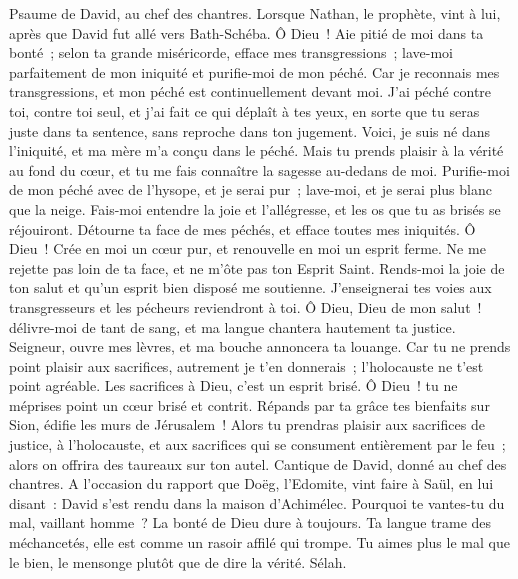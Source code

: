 \begin{multicols}{2}
\VerseOne{}Psaume de David, au chef des chantres.
Lorsque Nathan, le prophète, vint à lui, après que David fut allé vers Bath-Schéba.
Ô Dieu~! Aie pitié de moi dans ta bonté~; selon ta grande miséricorde, efface mes transgressions~;
lave-moi parfaitement de mon iniquité et purifie-moi de mon péché.
Car je reconnais mes transgressions, et mon péché est continuellement devant moi.
J'ai péché contre toi, contre toi seul, et j'ai fait ce qui déplaît à tes yeux, en sorte que tu seras juste dans ta sentence, sans reproche dans ton jugement.
Voici, je suis né dans l'iniquité, et ma mère m'a conçu dans le péché.
Mais tu prends plaisir à la vérité au fond du cœur, et tu me fais connaître la sagesse au-dedans de moi.
Purifie-moi de mon péché avec de l'hysope, et je serai pur~; lave-moi, et je serai plus blanc que la neige.
Fais-moi entendre la joie et l'allégresse, et les os que tu as brisés se réjouiront.
Détourne ta face de mes péchés, et efface toutes mes iniquités.
Ô Dieu~! Crée en moi un cœur pur, et renouvelle en moi un esprit ferme.
Ne me rejette pas loin de ta face, et ne m'ôte pas ton Esprit Saint.
Rends-moi la joie de ton salut et qu'un esprit bien disposé me soutienne.
J'enseignerai tes voies aux transgresseurs et les pécheurs reviendront à toi.
Ô Dieu, Dieu de mon salut~! délivre-moi de tant de sang, et ma langue chantera hautement ta justice.
Seigneur, ouvre mes lèvres, et ma bouche annoncera ta louange.
Car tu ne prends point plaisir aux sacrifices, autrement je t'en donnerais~; l'holocauste ne t'est point agréable.
Les sacrifices à Dieu, c'est un esprit brisé. Ô Dieu~! tu ne méprises point un cœur brisé et contrit.
Répands par ta grâce tes bienfaits sur Sion, édifie les murs de Jérusalem~!
Alors tu prendras plaisir aux sacrifices de justice, à l'holocauste, et aux sacrifices qui se consument entièrement par le feu~; alors on offrira des taureaux sur ton autel.
\VerseOne{}Cantique de David, donné au chef des chantres.
A l'occasion du rapport que Doëg, l'Edomite, vint faire à Saül, en lui disant~: David s'est rendu dans la maison d'Achimélec.
Pourquoi te vantes-tu du mal, vaillant homme~? La bonté de Dieu dure à toujours.
Ta langue trame des méchancetés, elle est comme un rasoir affilé qui trompe.
Tu aimes plus le mal que le bien, le mensonge plutôt que de dire la vérité. Sélah.

\end{multicols}
